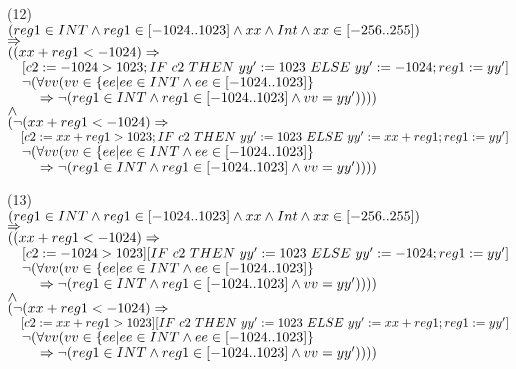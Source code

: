 \bigskip\noindent
(12)\\
$(reg1\in INT\et reg1\in[-1024..1023]\et xx\et Int\et xx\in[-256..255])$\\
$\fleche$\\
$(({xx+reg1} < -1024)\fleche$\\
$\tab{1em}[c2:= -1024 > 1023; IF~ c2 ~THEN~ yy' := 1023 ~ELSE~ yy' := -1024; reg1:=yy']$\\
$\tab{1em}\neg(\forall vv (vv\in \{ ee | ee\in INT \et ee\in [-1024..1023] \}$\\
$\tab{2em}\fleche\neg(reg1\in INT\et reg1\in[-1024..1023]\et vv = yy'))))$\\
$\et$\\
$(\neg({xx+reg1} < -1024)\fleche$\\
$\tab{1em}[c2:= xx+reg1 > 1023; IF~ c2 ~THEN~ yy' := 1023 ~ELSE~ yy' := xx+reg1; reg1:=yy']$\\
$\tab{1em}\neg(\forall vv (vv\in \{ ee | ee\in INT \et ee\in [-1024..1023] \}$\\
$\tab{2em}\fleche\neg(reg1\in INT\et reg1\in[-1024..1023]\et vv = yy'))))$

\bigskip\noindent
(13)\\
$(reg1\in INT\et reg1\in[-1024..1023]\et xx\et Int\et xx\in[-256..255])$\\
$\fleche$\\
$(({xx+reg1} < -1024)\fleche$\\
$\tab{1em}[c2:= -1024 > 1023] [IF~ c2 ~THEN~ yy' := 1023 ~ELSE~ yy' := -1024; reg1:=yy']$\\
$\tab{1em}\neg(\forall vv (vv\in \{ ee | ee\in INT \et ee\in [-1024..1023] \}$\\
$\tab{2em}\fleche\neg(reg1\in INT\et reg1\in[-1024..1023]\et vv = yy'))))$\\
$\et$\\
$(\neg({xx+reg1} < -1024)\fleche$\\
$\tab{1em}[c2:= xx+reg1 > 1023] [IF~ c2 ~THEN~ yy' := 1023 ~ELSE~ yy' := xx+reg1; reg1:=yy']$\\
$\tab{1em}\neg(\forall vv (vv\in \{ ee | ee\in INT \et ee\in [-1024..1023] \}$\\
$\tab{2em}\fleche\neg(reg1\in INT\et reg1\in[-1024..1023]\et vv = yy'))))$


